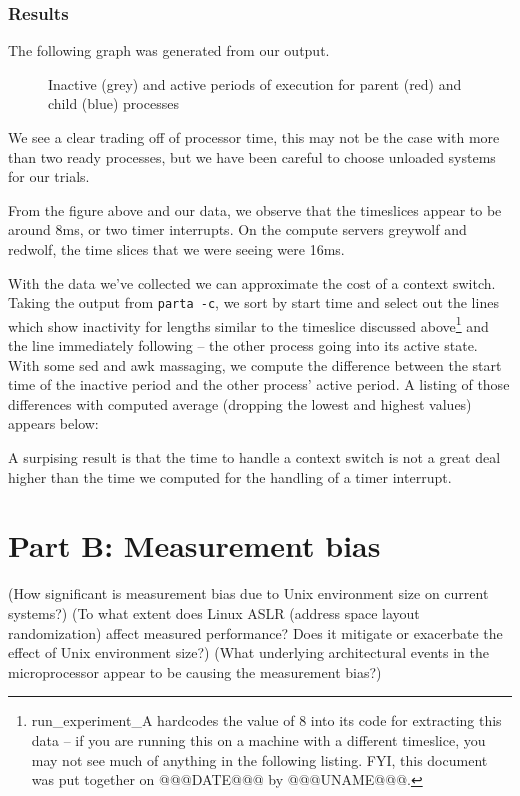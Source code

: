 \documentclass{article}
\begin{document}
\subsubsection{Results}
The following graph was generated from our output.
\begin{figure}[h]
    \caption{Inactive (grey) and active periods of execution for parent (red)
    and child (blue) processes}
    
\end{figure}

We see a clear trading off of processor time, this may not be the case with 
more than two ready processes, but we have been careful to choose unloaded
systems for our trials.

From the figure above and our data, we observe that the timeslices appear to
be around 8ms, or two timer interrupts. On the compute servers greywolf and 
redwolf, the time slices that we were seeing were 16ms.

With the data we've collected we can approximate the cost of a context switch.
Taking the output from \lstinline{parta -c}, we sort by start time and select
out the lines which show inactivity for lengths similar to the timeslice
discussed above\footnote{run\_experiment\_A hardcodes the value of 8 into its
code for extracting this data -- if you are running this on a machine with a
different timeslice, you may not see much of anything in the following listing.
FYI, this document was put together on @@@DATE@@@ by @@@UNAME@@@.}
and the line immediately following -- the other process going
into its active state. With some sed and awk massaging, we compute the
difference between the start time of the inactive period and the other
process' active period. A listing of those differences with computed average
(dropping the lowest and highest values) appears below:
\begin{framed}
    \label{lst:switch_time}
    
\end{framed}

A surpising result is that the time to handle a context switch is not a great
deal higher than the time we computed for the handling of a timer interrupt.

\newpage
\section{Part B: Measurement bias}
\label{sec:B}
(How significant is measurement bias due to Unix environment size on current systems?)
(To what extent does Linux ASLR (address space layout randomization) affect measured performance? Does it mitigate or exacerbate the effect of Unix environment size?)
(What underlying architectural events in the microprocessor appear to be causing the measurement bias?)
\end{document}
